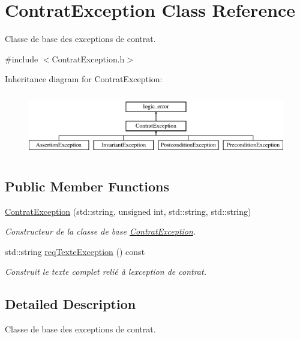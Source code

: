\hypertarget{classContratException}{}\section{Contrat\+Exception Class Reference}
\label{classContratException}


Classe de base des exceptions de contrat.  




{\ttfamily \#include $<$Contrat\+Exception.\+h$>$}

Inheritance diagram for Contrat\+Exception\+:\begin{figure}[H]
\begin{center}
\leavevmode
\includegraphics[height=2.800000cm]{classContratException}
\end{center}
\end{figure}
\subsection*{Public Member Functions}
\begin{DoxyCompactItemize}
\item 
\hyperlink{classContratException_ad6c04fb577e960f87e010b125aa636a0}{Contrat\+Exception} (std\+::string, unsigned int, std\+::string, std\+::string)
\begin{DoxyCompactList}\small\item\em Constructeur de la classe de base \hyperlink{classContratException}{Contrat\+Exception}. \end{DoxyCompactList}\item 
std\+::string \hyperlink{classContratException_a59c9ed58985dcdd70af4ee50b2937707}{req\+Texte\+Exception} () const
\begin{DoxyCompactList}\small\item\em Construit le texte complet relié à l\textquotesingle{}exception de contrat. \end{DoxyCompactList}\end{DoxyCompactItemize}


\subsection{Detailed Description}
Classe de base des exceptions de contrat. 

